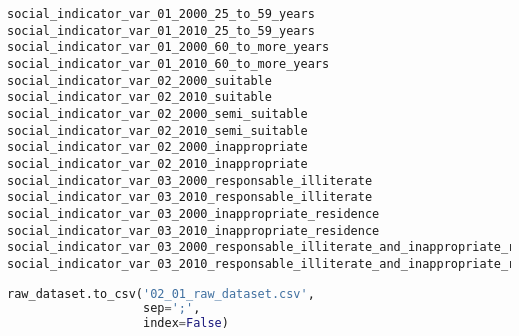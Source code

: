 \begin{lstlisting}
social_indicator_var_01_2000_25_to_59_years
social_indicator_var_01_2010_25_to_59_years
social_indicator_var_01_2000_60_to_more_years
social_indicator_var_01_2010_60_to_more_years
social_indicator_var_02_2000_suitable
social_indicator_var_02_2010_suitable
social_indicator_var_02_2000_semi_suitable
social_indicator_var_02_2010_semi_suitable
social_indicator_var_02_2000_inappropriate
social_indicator_var_02_2010_inappropriate
social_indicator_var_03_2000_responsable_illiterate
social_indicator_var_03_2010_responsable_illiterate
social_indicator_var_03_2000_inappropriate_residence
social_indicator_var_03_2010_inappropriate_residence
social_indicator_var_03_2000_responsable_illiterate_and_inappropriate_residence
social_indicator_var_03_2010_responsable_illiterate_and_inappropriate_residence
\end{lstlisting}

\begin{lstlisting}[language=Python]
raw_dataset.to_csv('02_01_raw_dataset.csv',
                   sep=';',
                   index=False)
\end{lstlisting}

